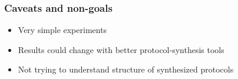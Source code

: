 \begin{frame}
\frametitle{Caveats and non-goals}
\begin{itemize}
\item Very simple experiments
\item Results could change with better protocol-synthesis tools
\item Not trying to understand structure of synthesized protocols
\end{itemize}
\end{frame}
